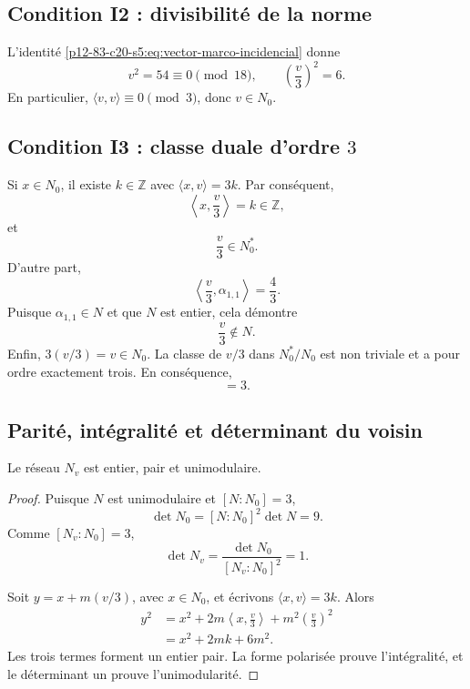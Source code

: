 \subsection{Condition I2 : divisibilité de la norme}

L'identité \eqref{p12-83-c20-s5:eq:vector-marco-incidencial} donne
\begin{equation}
 v^2=54\equiv0\pmod{18},
 \qquad
 \left(\frac v3\right)^2=6.
 \label{p12-83-c20-s5:eq:condicion-i2-vecino}
\end{equation}
En particulier, \(\langle v,v\rangle\equiv0\pmod3\), donc
\(v\in N_0\).

\subsection{Condition I3 : classe duale d'ordre \(3\)}

Si \(x\in N_0\), il existe \(k\in\mathbb Z\) avec
\(\langle x,v\rangle=3k\). Par conséquent,
\[
 \left\langle x,\frac v3\right\rangle=k\in\mathbb Z,
\]
et
\begin{equation}
 \frac v3\in N_0^*.
 \label{p12-83-c20-s5:eq:v-tercio-en-dual-nucleo}
\end{equation}
D'autre part,
\[
 \left\langle\frac v3,\alpha_{1,1}\right\rangle=\frac43.
\]
Puisque \(\alpha_{1,1}\in N\) et que \(N\) est entier, cela démontre
\begin{equation}
 \frac v3\notin N.
 \label{p12-83-c20-s5:eq:v-tercio-no-en-niemeier}
\end{equation}
Enfin, \(3(v/3)=v\in N_0\). La classe de \(v/3\) dans
\(N_0^*/N_0\) est non triviale et a pour ordre exactement trois. En
conséquence,
\begin{equation}
 [N_v:N_0]=3.
 \label{p12-83-c20-s5:eq:indice-extension-vecino}
\end{equation}

\subsection{Parité, intégralité et déterminant du voisin}

\begin{proposition}
\label{p12-83-c20-s5:prop:estructura-unimodular-vecino}
Le réseau \(N_v\) est entier, pair et unimodulaire.
\end{proposition}

\begin{proof}
Puisque \(N\) est unimodulaire et \([N:N_0]=3\),
\[
 \det N_0=[N:N_0]^2\det N=9.
\]
Comme \([N_v:N_0]=3\),
\[
 \det N_v=\frac{\det N_0}{[N_v:N_0]^2}=1.
\]

Soit \(y=x+m(v/3)\), avec \(x\in N_0\), et écrivons
\(\langle x,v\rangle=3k\). Alors
\begin{align*}
 y^2
 &=x^2+2m\left\langle x,\frac v3\right\rangle
       +m^2\left(\frac v3\right)^2\\
 &=x^2+2mk+6m^2.
\end{align*}
Les trois termes forment un entier pair. La forme polarisée prouve
l'intégralité, et le déterminant un prouve l'unimodularité.
\end{proof}


